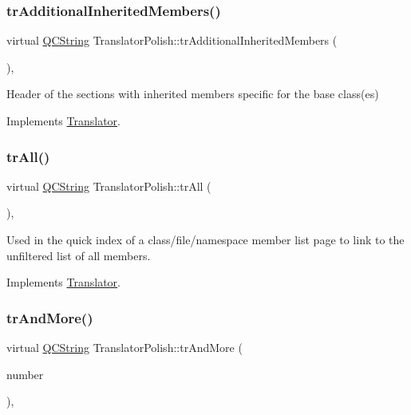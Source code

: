 \subsubsection{\texorpdfstring{trAdditionalInheritedMembers()}{trAdditionalInheritedMembers()}}
{\footnotesize\ttfamily virtual \mbox{\hyperlink{class_q_c_string}{Q\+C\+String}} Translator\+Polish\+::tr\+Additional\+Inherited\+Members (\begin{DoxyParamCaption}{ }\end{DoxyParamCaption})\hspace{0.3cm}{\ttfamily [inline]}, {\ttfamily [virtual]}}

Header of the sections with inherited members specific for the base class(es) 

Implements \mbox{\hyperlink{class_translator}{Translator}}.

\mbox{\label{class_translator_polish_aca3e4c90b0b73f539b35583a3724a6dd}} 
\subsubsection{\texorpdfstring{trAll()}{trAll()}}
{\footnotesize\ttfamily virtual \mbox{\hyperlink{class_q_c_string}{Q\+C\+String}} Translator\+Polish\+::tr\+All (\begin{DoxyParamCaption}{ }\end{DoxyParamCaption})\hspace{0.3cm}{\ttfamily [inline]}, {\ttfamily [virtual]}}

Used in the quick index of a class/file/namespace member list page to link to the unfiltered list of all members. 

Implements \mbox{\hyperlink{class_translator}{Translator}}.

\mbox{\label{class_translator_polish_a7c68aacd10a2ac5583af8e22f9da94b1}} 
\subsubsection{\texorpdfstring{trAndMore()}{trAndMore()}}
{\footnotesize\ttfamily virtual \mbox{\hyperlink{class_q_c_string}{Q\+C\+String}} Translator\+Polish\+::tr\+And\+More (\begin{DoxyParamCaption}\item[{const \mbox{\hyperlink{class_q_c_string}{Q\+C\+String}} \&}]{number }\end{DoxyParamCaption})\hspace{0.3cm}{\ttfamily [inline]}, {\ttfamily [virtual]}}

